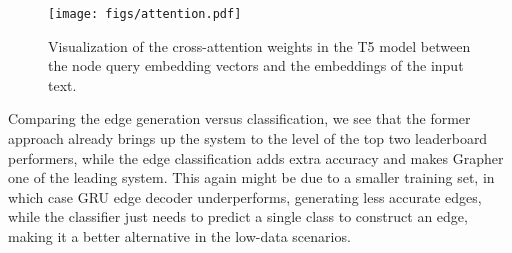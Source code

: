 \begin{figure}[th!]
\centering
\texttt{[image: figs/attention.pdf]}
\caption{Visualization of the cross-attention weights in the T5 model between the node query embedding vectors and the embeddings of the input text.}
\label{fig:node_attention}
\end{figure}



Comparing the edge generation versus classification, we see that the former approach already brings up the system to the level of the top two leaderboard performers, while the edge classification adds extra accuracy and makes Grapher one of the leading system. This again might be due to a smaller training set, in which case GRU edge decoder underperforms, generating less accurate edges, while the classifier just needs to predict a single class to construct an edge, making it a better alternative in the low-data scenarios.    




